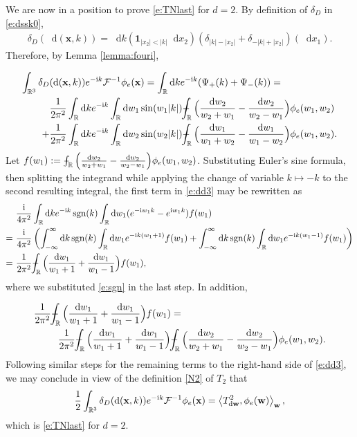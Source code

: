 \documentclass[11pt,A4,twoside]{article}
\newcommand\ind{\mathbf{1}}
\numberwithin{equation}{section}
\renewcommand{\vec}{\mathbf}
\newcommand{\intcc}{\dashint}
\newcommand{\Fi}{\mathcal{F}^{-1}}
\renewcommand*\d{\mathop{}\!\mathrm{d}}
\newcommand{\inner}[1]{\left\langle#1 \right\rangle}
\newcommand{\x}{\mathbf{x}}
\newcommand{\w}{\mathbf{w}}
\newcommand{\R}{\mathbbm{R}}
\DeclareMathOperator*{\sgn}{sgn}
\def\Phint#1{\mathchoice
  {\XXint\displaystyle\textstyle{#1}}%
  {\XXint\textstyle\scriptstyle{#1}}%
  {\XXint\scriptstyle\scriptscriptstyle{#1}}%
  {\XXint\scriptscriptstyle\scriptscriptstyle{#1}}%
  \!\int}
\def\XXint#1#2#3{{\setbox0=\hbox{$#1{#2#3}{\int}$}
    \vcenter{\hbox{$#2#3$}}\kern-.5\wd0}}
\def\dashint{\Phint-}
\def\qqq{\;\;\;\;\;\;\;\;\;}
\newcommand{\beqa}{\begin{eqnarray}}
\newcommand{\eeqa}{\end{eqnarray}}
\def\bal{\begin{aligned}}
\def\eal{\end{aligned}}
\def\bll#1{
\beqa\label{#1}\bal
}\def\lel{\eal\eeqa}
\newcommand{\beql}[1]{\bll{#1}}
\newcommand{\eeql}{\lel}
\theoremstyle{definition}
\theoremstyle{remark}
\def\R{\mathbb{R}}
\def\phie{\phi_e}
\def\theS{D}
\def\thermi{{\rm i}}%
\begin{document}
{{We are now in a position to prove \eqref{e:TNlast} for $d=2$. By definition of $ \delta_\theS$ in \eqref{e:dssk0},
\begin{align*}
    \delta_\theS(\d(\vec x, k))
    = \d k ( \ind_{|x_2|<|k|} \d x_2) (\delta_{|k|-|x_2|} + \delta_{-|k|+|x_2|})(\d x_1).
\end{align*}
Therefore, by Lemma \ref{lemma:fouri},
\beql{e:dd3}
\int_{\R^{3}} \delta_{\theS}&(\d(\vec x, k)) e^{-\thermi k} \Fi \phie (\x) =
\int_{\R} \d k e^{-\thermi k} (\Psi_+(k) + \Psi_-(k))  = 
  \\
    & \frac{1}{2\pi^2} \int_{\R} \d k e^{-\thermi k} \int_\R \d w_1 \sin(w_1|k|) \intcc_\R  \Big(\frac{\d w_2}{w_2 + w_1}- \frac{\d w_2}{w_2 - w_1}\Big)\phie(w_1,w_2)
    \\
    +& \frac{1}{2\pi^2}\int_{\R} \d k e^{-\thermi k} \int_\R\d w_2 \sin(w_2|k|) \intcc_\R  \Big(\frac{\d w_1}{w_1 + w_2}- \frac{\d w_1}{w_1 - w_2}\Big)\phie(w_1,w_2).
\eeql 
Let $f(w_1) := \intcc_\R \Big(\frac{\d w_2}{w_2 + w_1}- \frac{\d w_2}{w_2 - w_1}\Big)\phie(w_1,w_2)$. Substituting Euler's sine formula, then splitting the integrand while applying the change of variable $k \mapsto -k$ to the second resulting integral, the first term in \eqref{e:dd3} may be rewritten as
\begin{align*}
 & \frac{\thermi}{4\pi^2} \int_\R \d k e^{-\thermi k} \sgn(k)\int_\R \d w_1 (e^{-\thermi   w_1 k}- e^{\thermi  w_1 k}) f(w_1)
 \\
  =\ & \frac{\thermi}{4\pi^2} \left(\int_{-\infty}^\infty \d k  \sgn(k)  \int_\R \d w_1 e^{-\thermi   k(w_1+1) } f(w_1) + \int_{-\infty}^\infty \d k  \sgn(k)  \int_\R \d w_1 e^{-\thermi   k(w_1-1) } f(w_1)\right)\\
 =\ & \frac{1}{2\pi^2} \intcc_{\R}  \Big(\frac{\d w_1}{w_1+1}+\frac{\d w_1}{w_1-1}\Big)f(w_1),
\end{align*}
where we substituted \eqref{e:sgn} in the last step. In addition,
\beql{e:dd5}
    & \frac{1}{2\pi^2} \intcc_{\R}  \Big(\frac{\d w_1}{w_1+1}+\frac{\d w_1}{w_1-1}\Big)f(w_1)=\\ 
     &\qqq\frac{1}{2\pi^2} \intcc_{\R}  \Big(\frac{\d w_1}{w_1+1}+\frac{\d w_1}{w_1-1}\Big)\intcc_\R  \Big(\frac{\d w_2}{w_2 + w_1}- \frac{\d w_2}{w_2 - w_1}\Big)\phie(w_1,w_2).
\eeql
Following similar steps for the remaining terms to the right-hand side of \eqref{e:dd3}, we may conclude
in view of the definition \eqref{N2} of $T_2$
that
\begin{equation*}     
        \frac{1}{2}\int_{\R^{3}} \delta_\theS(\d(\vec x, k)) e^{-\thermi k} \Fi \phi_e (\x) =   \inner{T^2_{\d \w},\phi_e (\w)}_{\w},
    \end{equation*}
 which is \eqref{e:TNlast} for $d=2$.
}}
\end{document}
